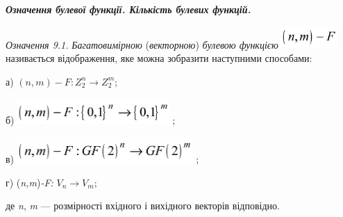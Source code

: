 \bigskip


\bigskip

{\centering\bfseries\itshape
Означення булевої функції.  Кількість булевих функцій. 
\par}


\bigskip


\bigskip

 \textit{Означення 9.1.}\textit{  }\textit{Багатовимірною} (\textit{векторною})
\textit{булевою функцією} 
\includegraphics[width=0.8417in,height=0.3346in]{crypt-img/crypt-img81.png} 
називається відображення, яке можна зобразити наступними способами:

а) $(n,m)-F:Z_{2}^{n}\rightarrow Z_{2}^m;$

б)  \includegraphics[width=2.2756in,height=0.3854in]{crypt-img/crypt-img82.png}
;

в)  \includegraphics[width=2.6339in,height=0.3862in]{crypt-img/crypt-img83.png}
; $ $

г)  (\textit{n}\textit{,}\textit{m})\textit{{}-}\textit{F}\textit{:}\textit{ }
$V_{n}\rightarrow V_m;$

де \textit{n}, \textit{m }--- розмірності вхідного і вихідного векторів
відповідно. 

